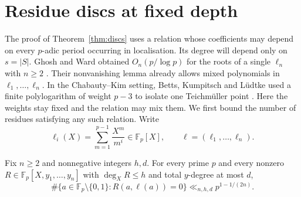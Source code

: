 \section{Residue discs at fixed depth}\label{sec:discs}

The proof of Theorem~\ref{thm:discs} uses a relation whose coefficients
may depend on every $p$-adic period occurring in localisation. Its degree
will depend only on $s=|S|$. Ghosh and Ward obtained
$O_n(p/\log p)$ for the roots of a single $\ell_n$ with $n\ge2$
\cite[Theorem~1]{GW}. Their nonvanishing lemma already allows mixed
polynomials in $\ell_1,\ldots,\ell_n$. In the Chabauty--Kim setting,
Betts, Kumpitsch and L\"udtke used a finite polylogarithm of weight
$p-3$ to isolate one Teichm\"uller point
\cite[Proposition~5.15]{BKL}. Here the weights stay fixed and the
relation may mix them. We first bound the number of residues satisfying
any such relation. Write
\[
  \ell_i(X)=\sum_{m=1}^{p-1}\frac{X^m}{m^i}\in\mathbb F_p[X],
  \qquad \boldsymbol\ell=(\ell_1,\ldots,\ell_n).
\]

\begin{lemma}\label{lem:mixed-disc-count}
Fix $n\ge2$ and nonnegative integers $h,d$. For every prime $p$ and every
nonzero $R\in\mathbb F_p[X,y_1,\ldots,y_n]$ with $\deg_X R\le h$
and total $y$-degree at most $d$,
\[
 \#\{a\in\mathbb F_p\setminus\{0,1\}:
                  R(a,\boldsymbol\ell(a))=0\}
       \ll_{n,h,d}p^{1-1/(2n)} .
\]
\end{lemma}

